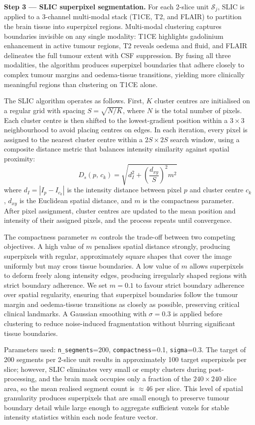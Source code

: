 \documentclass{article}
\begin{document}
\textbf{Step 3 --- SLIC superpixel segmentation.}
For each 2-slice unit $\mathcal{S}_j$, SLIC \cite{achanta2012slic} is applied to a
3-channel multi-modal stack (T1CE, T2, and FLAIR) to partition the brain tissue into
superpixel regions. Multi-modal clustering captures boundaries invisible on any single
modality: T1CE highlights gadolinium enhancement in active tumour regions, T2 reveals
oedema and fluid, and FLAIR delineates the full tumour extent with CSF suppression. By
fusing all three modalities, the algorithm produces superpixel boundaries that adhere
closely to complex tumour margins and oedema-tissue transitions, yielding more
clinically meaningful regions than clustering on T1CE alone.

The SLIC algorithm operates as follows. First, $K$ cluster centres are initialised
on a regular grid with spacing $S = \sqrt{N/K}$, where $N$ is the total number of
pixels. Each cluster centre is then shifted to the lowest-gradient position within a
$3 \times 3$ neighbourhood to avoid placing centres on edges. In each iteration,
every pixel is assigned to the nearest cluster centre within a $2S \times 2S$ search
window, using a composite distance metric that balances intensity similarity against
spatial proximity:
\[
    D_s(p,\,c_k) = \sqrt{d_I^2 + \left(\frac{d_{xy}}{S}\right)^2 m^2}
\]
where $d_I = |I_p - I_{c_k}|$ is the intensity distance between pixel $p$ and
cluster centre $c_k$, $d_{xy}$ is the Euclidean spatial distance, and $m$ is the
compactness parameter. After pixel assignment, cluster centres are updated to the
mean position and intensity of their assigned pixels, and the process repeats until
convergence.

The compactness parameter $m$ controls the trade-off between two competing
objectives. A high value of $m$ penalises spatial distance strongly, producing
superpixels with regular, approximately square shapes that cover the image uniformly
but may cross tissue boundaries. A low value of $m$ allows superpixels to deform
freely along intensity edges, producing irregularly shaped regions with strict boundary
adherence. We set $m = 0.1$ to favour strict boundary adherence over spatial regularity,
ensuring that superpixel boundaries follow the tumour margin and oedema-tissue
transitions as closely as possible, preserving critical clinical landmarks. A Gaussian
smoothing with $\sigma = 0.3$ is applied before clustering to reduce noise-induced
fragmentation without blurring significant tissue boundaries.

Parameters used: \texttt{n\_segments}=200, \texttt{compactness}=0.1,
\texttt{sigma}=0.3. The target of 200 segments per 2-slice unit results in
approximately 100 target superpixels per slice; however, SLIC eliminates
very small or empty clusters during post-processing, and the brain mask occupies
only a fraction of the $240 \times 240$ slice area, so the mean realised segment
count is $\approx$46 per slice. This level of spatial granularity produces
superpixels that are small enough to preserve tumour boundary detail while large
enough to aggregate sufficient voxels for stable intensity statistics within each
node feature vector.
\end{document}

